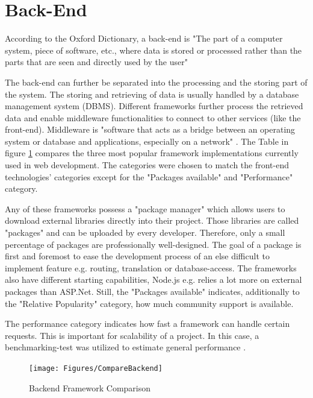 \section{Back-End}

According to the Oxford Dictionary, a back-end is 
"The part of a computer system, piece of software, etc., where data is stored or processed rather 
than the parts that are seen and directly used by the user" \parencite{backendDef}

The back-end can further be separated into the processing and the storing part of the system.
The storing and retrieving of data is usually handled by a database management system (DBMS).
Different frameworks further process the retrieved data and enable middleware functionalities to connect to other services (like the front-end).
Middleware is "software that acts as a bridge between an operating 
system or database 
and applications, especially on a network" \parencite{middlewaredef}. 
The Table in figure \ref{fig:CompareBackend} 
compares the three most popular framework implementations currently used in web development.
The categories were chosen to match the front-end technologies' categories
except for the "Packages available" and "Performance" category.

Any of these frameworks possess a "package manager" which allows users to download external libraries directly into their project. 
Those libraries are called "packages" and can be uploaded by every developer.
Therefore, only a small percentage of packages are professionally well-designed. 
The goal of a package is first and foremost to ease the development process of an else difficult to implement feature e.g. routing, translation or database-access.
The frameworks also have different starting capabilities, Node.js e.g. relies a lot more on external packages than ASP.Net.
Still, the "Packages available" indicates, additionally to the "Relative Popularity" category, how much community support is available.

The performance category indicates how fast a framework can handle certain requests. 
This is important for scalability of a project. 
In this case, a benchmarking-test was utilized to estimate general performance \parencite{benchmarkNode.NET}.

\begin{figure}[b]
	\centering
    \texttt{[image: Figures/CompareBackend]}
	\decoRule
	\caption[Backend Framework Comparison]{Backend Framework Comparison}
	\label{fig:CompareBackend}
\end{figure}

